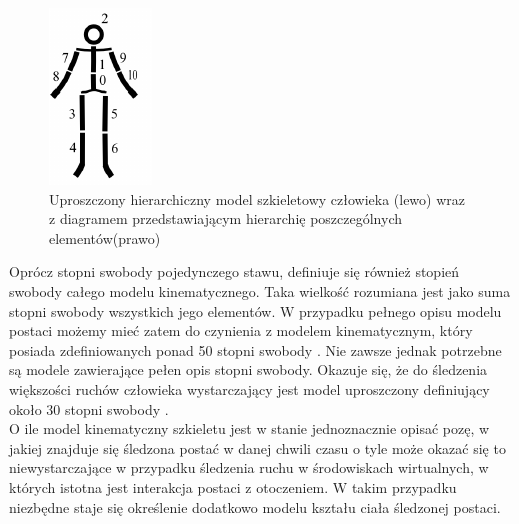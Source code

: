 \begin{figure}[!htb]
	\centering
	 \begin{minipage}{.2\textwidth}
        \centering
        \includegraphics{images/hierarchical-structure.png}       
    \end{minipage}%
    \begin{minipage}{0.8\textwidth}
        \centering
		\scalebox{0.8}{
       
		}
    \end{minipage}
	\caption{Uproszczony hierarchiczny model szkieletowy człowieka (lewo) wraz z diagramem przedstawiającym hierarchię poszczególnych elementów(prawo)\cite{Kwolek2014}}
	\label{fig:literature:skeletonModelHierarchy}
\end{figure}

Oprócz stopni swobody pojedynczego stawu, definiuje się również stopień swobody całego modelu kinematycznego. Taka wielkość rozumiana jest jako suma stopni swobody wszystkich jego elementów. W przypadku pełnego opisu modelu postaci możemy mieć zatem do czynienia z modelem kinematycznym, który posiada zdefiniowanych ponad 50 stopni swobody \cite{Agarwal2006}. Nie zawsze jednak potrzebne są modele zawierające pełen opis stopni swobody. Okazuje się, że do śledzenia większości ruchów człowieka wystarczający jest model uproszczony definiujący około 30 stopni swobody \cite{Sigal2006,Kwolek2011}.\\

O ile model kinematyczny szkieletu jest w stanie jednoznacznie opisać pozę, w jakiej znajduje się śledzona postać w danej chwili czasu o tyle może okazać się to niewystarczające w przypadku śledzenia ruchu w środowiskach wirtualnych, w których istotna jest interakcja postaci z otoczeniem. W takim przypadku niezbędne staje się określenie dodatkowo modelu kształu ciała śledzonej postaci.
		
